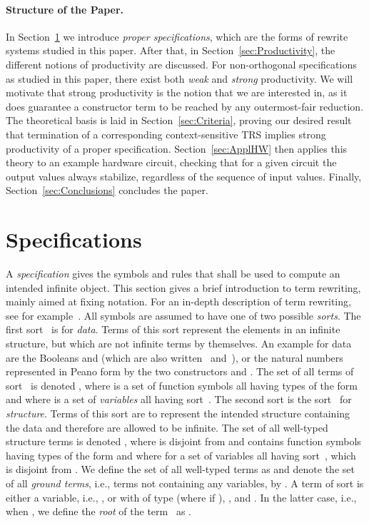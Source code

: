 \documentclass{eptcs}
\begin{document}
\paragraph{Structure of the Paper.} In Section~\ref{sec:Specifications} we
introduce \emph{proper specifications}, which are the forms of rewrite systems
studied in this paper. After that, in Section~\ref{sec:Productivity}, the
different notions of productivity are discussed. For non-orthogonal
specifications as studied in this paper, there exist both \emph{weak} and
\emph{strong} productivity. We will motivate that strong productivity is the
notion that we are interested in, as it does guarantee a constructor term to
be reached by any outermost-fair reduction.
The theoretical basis is laid in Section~\ref{sec:Criteria},
proving our desired result that termination of a corresponding context-sensitive
TRS implies strong productivity of a proper specification.
Section~\ref{sec:ApplHW} then applies this theory to an example hardware
circuit, checking that for a given circuit the output values always stabilize,
regardless of the sequence of input values.
Finally, Section~\ref{sec:Conclusions} concludes the paper.

\section{Specifications}
\label{sec:Specifications}

A \emph{specification} gives the symbols and rules that shall be used to
compute an intended infinite object. This section gives a brief introduction to
term rewriting, mainly aimed at fixing notation. For an in-depth description of
term rewriting, see for example~\cite{BN98, Terese03}.
All symbols are assumed to have one of two possible \emph{sorts}.
The first sort~ is for \emph{data}. Terms of this sort represent the
elements in an infinite structure, but which are not infinite terms by
themselves. An example for data are the Booleans  and
 (which are also written~ and~),
or the natural numbers represented in Peano form by the two constructors 
and . The set of all terms of sort~ is denoted
, where  is a set of function symbols all having
types of the form  and where  is a set of \emph{variables}
all having sort~.
The second sort is the sort~ for \emph{structure}. Terms of this sort are to
represent the intended structure containing the data and therefore are allowed
to be infinite. The set of all well-typed structure terms is denoted
, where
 is disjoint from  and contains function symbols having
types of the form  and where
 for a set  of variables all having sort~, which
is disjoint from .
We define the set of all well-typed terms as
 and denote
the set of all \emph{ground terms}, i.e., terms not containing any variables,
by .
A term  of sort 
is either a variable, i.e., ,
or 
with  of type 
(where  if ),
,
and .
In the latter case, i.e., when , we
define the \emph{root} of the term~ as .
\end{document}
